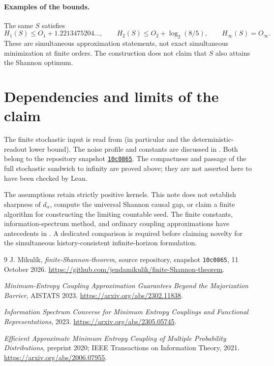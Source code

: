 \documentclass[11pt,a4paper]{article}
\begin{document}
\paragraph{Examples of the bounds.}
The same $S$ satisfies
\[
 H_1(S)\le O_1+1.2213475204\ldots,\qquad
 H_2(S)\le O_2+\log_2(8/5),\qquad H_\infty(S)=O_\infty.
\]
These are simultaneous approximation statements, not exact simultaneous
minimization at finite orders. The construction does not claim that $S$
also attains the Shannon optimum.

\section{Dependencies and limits of the claim}
The finite stochastic input is read from
 (in particular
 and the deterministic-readout lower bound).
The noise profile and constants are discussed in
. Both belong to the repository snapshot
\href{https://github.com/jendamikulik/finite-Shannon-theorem/tree/10c0865d63644aa9ffe9d6e8adbe6943a9f05697}{\texttt{10c0865}}.
The compactness and passage of the full stochastic sandwich to infinity are
proved above; they are not asserted here to have been checked by Lean.

The assumptions retain strictly positive kernels. This note does not
establish sharpness of $d_\alpha$, compute the universal Shannon causal gap,
or claim a finite algorithm for constructing the limiting countable seed.
The finite constants, information-spectrum method, and ordinary coupling
approximations have antecedents in \cite{compton,spectrum,multiple}.
A dedicated comparison is required before claiming novelty for the
simultaneous history-consistent infinite-horizon formulation.

\begin{thebibliography}{9}\small
{}
J. Mikul\'ik, \emph{finite-Shannon-theorem}, source repository,
snapshot \texttt{10c0865}, 11 October 2026.
\url{https://github.com/jendamikulik/finite-Shannon-theorem}.

\emph{Minimum-Entropy Coupling Approximation Guarantees Beyond the
Majorization Barrier}, AISTATS 2023.
\url{https://arxiv.org/abs/2302.11838}.

\emph{Information Spectrum Converse for Minimum Entropy Couplings and
Functional Representations}, 2023.
\url{https://arxiv.org/abs/2305.05745}.

\emph{Efficient Approximate Minimum Entropy Coupling of Multiple Probability
Distributions}, preprint 2020; IEEE Transactions on Information Theory, 2021.
\url{https://arxiv.org/abs/2006.07955}.
\end{thebibliography}
\end{document}
